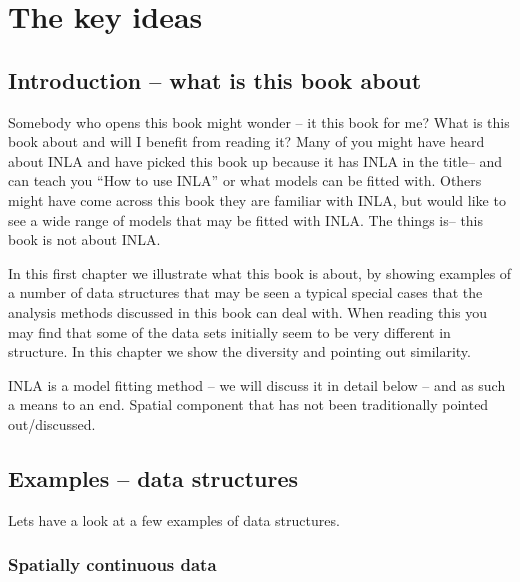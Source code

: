 
\chapter{The key ideas}

\section{Introduction -- what is this book about}
Somebody who opens this book might wonder -- it this book for me? What is this book about and will I benefit from reading it?
 Many of you might have heard about INLA and have picked this book up because it has INLA in the title-- and can teach you ``How to use INLA'' or what models can be fitted with. Others might have come across this book they are familiar with INLA, but would like to see a wide  range of models that may be fitted with INLA. The things is-- this book is not about INLA.
 
In this first chapter we illustrate what this book  is about, by showing examples of a number of data structures that may be seen a typical special cases that the analysis methods discussed in this book can deal with. When reading this you may find that some of the data sets initially seem to be very different in structure. In this chapter we show the diversity and pointing out similarity.

INLA is a model fitting method -- we will discuss it in detail below -- and as such a means to an end. 
Spatial component that has not been traditionally pointed out/discussed.


\section{Examples -- data structures}

Lets have a look at a few examples of data structures.

\subsection{Spatially continuous data}

